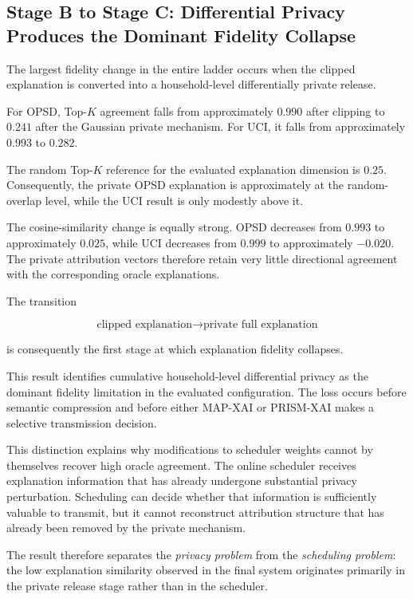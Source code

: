 \documentclass[11pt]{article}
\begin{document}
\subsection{Stage B to Stage C: Differential Privacy Produces the Dominant Fidelity Collapse}

The largest fidelity change in the entire ladder occurs when the clipped explanation is converted into a household-level differentially private release.

For OPSD, Top-$K$ agreement falls from approximately \(0.990\) after clipping to \(0.241\) after the Gaussian private mechanism. For UCI, it falls from approximately \(0.993\) to \(0.282\).

The random Top-$K$ reference for the evaluated explanation dimension is \(0.25\). Consequently, the private OPSD explanation is approximately at the random-overlap level, while the UCI result is only modestly above it.

The cosine-similarity change is equally strong. OPSD decreases from \(0.993\) to approximately \(0.025\), while UCI decreases from \(0.999\) to approximately \(-0.020\). The private attribution vectors therefore retain very little directional agreement with the corresponding oracle explanations.

The transition

$$
\text{clipped explanation}
\rightarrow
\text{private full explanation}
$$

is consequently the first stage at which explanation fidelity collapses.

This result identifies cumulative household-level differential privacy as the dominant fidelity limitation in the evaluated configuration. The loss occurs before semantic compression and before either MAP-XAI or PRISM-XAI makes a selective transmission decision.

This distinction explains why modifications to scheduler weights cannot by themselves recover high oracle agreement. The online scheduler receives explanation information that has already undergone substantial privacy perturbation. Scheduling can decide whether that information is sufficiently valuable to transmit, but it cannot reconstruct attribution structure that has already been removed by the private mechanism.

The result therefore separates the \emph{privacy problem} from the \emph{scheduling problem}: the low explanation similarity observed in the final system originates primarily in the private release stage rather than in the scheduler.
\end{document}

